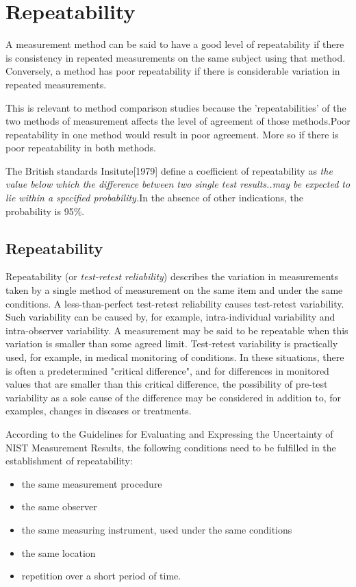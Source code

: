 \documentclass[Chap2cmain.tex]{subfiles}
\begin{document}
\section{Repeatability}
A measurement method can be said to have a good level of repeatability if there is consistency in repeated measurements on
the same subject using that method. Conversely, a method has poor
repeatability if there is considerable variation in repeated measurements.


This is relevant to method comparison studies because the 'repeatabilities' of the two methods of measurement affects the
level of agreement of those methods.Poor repeatability in one method would result in poor agreement. More so if there is poor
repeatability in both methods.

The British standards Insitute[1979] define a coefficient of repeatability  as \emph{the value below which the difference
between two single test results..may be expected to lie within a specified probability.}In the absence of
other indications, the probability is 95\%.

\subsection{Repeatability}
Repeatability (or \textit{test-retest reliability})  describes the variation in measurements taken by a single method of measurement on the same item and under the same conditions. 
A less-than-perfect test-retest reliability causes test-retest variability. Such variability can be caused by, for example, intra-individual variability and intra-observer variability. 
A measurement may be said to be repeatable when this variation is smaller than some agreed limit.
Test-retest variability is practically used, for example, in medical monitoring of conditions. In these situations, there is often a predetermined "critical difference", and for differences in monitored values that are smaller than this critical difference, the possibility of pre-test variability as a sole cause of the difference may be considered in addition to, for examples, changes in diseases or treatments.

According to the Guidelines for Evaluating and Expressing the Uncertainty of NIST Measurement Results, the following conditions need to be fulfilled in the establishment of repeatability:
\begin{itemize}
	\item	the same measurement procedure
	\item	the same observer
	\item	the same measuring instrument, used under the same conditions
	\item	the same location
	\item	repetition over a short period of time.
\end{itemize}
\newpage
\end{document}

